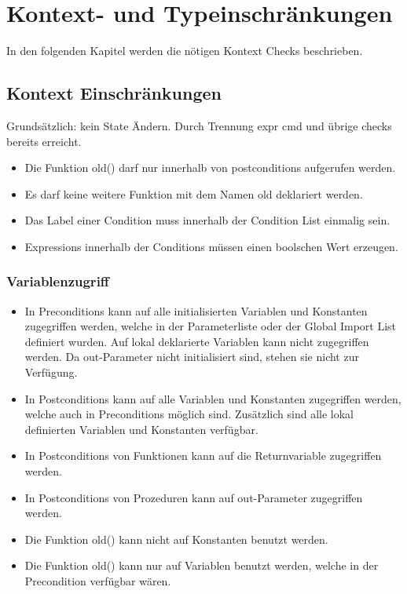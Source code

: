 \section{Kontext- und Typeinschränkungen}
\label{sec:constraints}
In den folgenden Kapitel werden die nötigen Kontext Checks beschrieben.

\subsection{Kontext Einschränkungen}

Grundsätzlich: kein State Ändern. Durch Trennung expr cmd  und übrige checks bereits erreicht.

\begin{itemize}


\item Die Funktion old() darf nur innerhalb von postconditions aufgerufen werden.
\item Es darf keine weitere Funktion mit dem Namen old deklariert werden.
\item Das Label einer Condition muss innerhalb der Condition List einmalig sein.
\item Expressions innerhalb der Conditions müssen einen boolschen Wert erzeugen.

\end{itemize}

\subsubsection{Variablenzugriff}

\begin{itemize}
\item In Preconditions kann auf alle initialisierten Variablen und Konstanten zugegriffen werden, welche 
in der Parameterliste oder der Global Import List definiert wurden. Auf lokal deklarierte Variablen 
kann nicht zugegriffen werden. Da out-Parameter nicht initialisiert sind, stehen sie nicht zur
Verfügung.
\item In Postconditions kann auf alle Variablen und Konstanten zugegriffen werden, welche auch in 
Preconditions möglich sind. Zusätzlich sind alle lokal definierten Variablen und Konstanten verfügbar.
\item In Postconditions von Funktionen kann auf die Returnvariable zugegriffen werden.
\item In Postconditions von Prozeduren kann auf out-Parameter zugegriffen werden.
\item Die Funktion old() kann nicht auf Konstanten benutzt werden.
\item Die Funktion old() kann nur auf Variablen benutzt werden, welche in der Precondition verfügbar wären.

\end{itemize}



